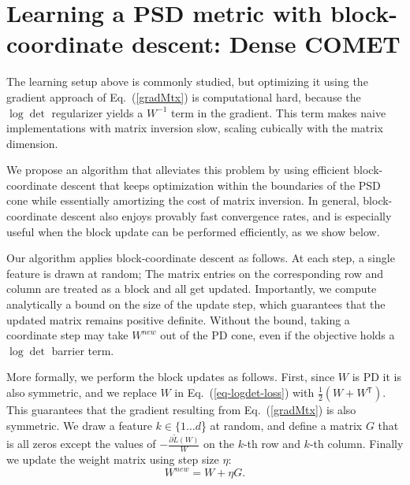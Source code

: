 \documentclass[twoside,11pt]{article}
\newcommand\mat[1]{{#1}}
\newcommand{\T}{{}^\mathsf{T}}
\newcommand{\W}{\mat{W}}
\newcommand{\newW}{{\mat{W^{new}}}}
\newcommand{\tL}{\tilde{L}(\W)}
\newcommand{\grd}{\frac{\partial \tL}{\W}}
\renewcommand{\eqref}[1]{Eq.~(\ref{#1})}
\begin{document}
\section{Learning a PSD metric with block-coordinate descent: Dense COMET}

The learning setup above is commonly studied, but 
optimizing it using the gradient approach of \eqref{gradMtx} is computational hard, because the $\log \det$ regularizer yields a $\W^{-1}$ term in the gradient. This term makes naive implementations with matrix inversion slow, scaling cubically with the matrix dimension. 

We propose an algorithm that alleviates this problem by using efficient block-coordinate descent that keeps optimization within the boundaries of the PSD cone while essentially amortizing the cost of matrix inversion.
In general, block-coordinate descent also enjoys provably fast convergence rates, and is especially useful when the block update can be performed efficiently, as we show below.

Our algorithm applies block-coordinate descent as follows. At each step, a single feature is drawn at random; The matrix entries on the corresponding row and column are treated as a block and all get updated. Importantly, we compute analytically a bound on the size of the update step, which guarantees that the updated matrix remains positive definite. Without the bound, taking a coordinate step may take $\newW$ out of the PD cone, even if the objective holds a $\log\det$ barrier term.

More formally, we perform the block updates as follows. First, since $\W$ is PD it is also symmetric, and we replace $\W$ in \eqref{eq-logdet-loss} with $\tfrac{1}{2}(\W + \W\T)$. This guarantees that the gradient resulting from \eqref{gradMtx} is also symmetric. We draw a feature $k \in \{1 \ldots d$\} at random, and define a matrix $\mat{G}$ that is all zeros except the values of $-\grd$ on the $k$-th row and $k$-th column. Finally we update the weight matrix using step size $\eta$:
\begin{equation}
    \newW = \W +\eta \mat{G}.
\label{updateEq}
\end{equation}
\end{document}
